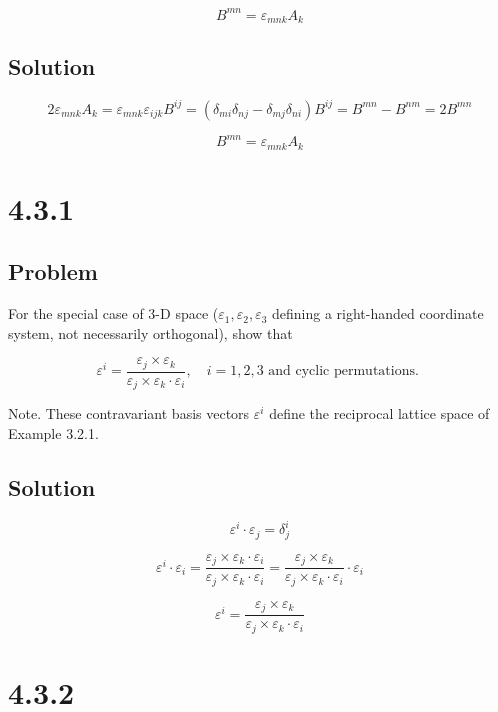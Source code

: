 \documentclass[12pt]{article}
\begin{document}
\[
    B^{mn} = \varepsilon_{mnk}A_k
\]

\subsection{Solution}

\[
    2\varepsilon_{mnk}A_k = \varepsilon_{mnk}\varepsilon_{ijk}B^{ij}
    = \left(\delta_{mi}\delta_{nj}-\delta_{mj}\delta_{ni}\right) B^{ij}
    = B^{mn}-B^{nm} = 2B^{mn}
\]

\[
    B^{mn} = \varepsilon_{mnk}A_k
\]

\newpage
\section{4.3.1}

\subsection{Problem}

For the special case of 3-D space (\(\varepsilon_1, \varepsilon_2, \varepsilon_3\) defining a right-handed coordinate system,
not necessarily orthogonal), show that

\[
    \varepsilon^i = \frac{\varepsilon_j \times \varepsilon_k}{\varepsilon_j \times \varepsilon_k \cdot \varepsilon_i}, \quad i = 1, 2, 3 \text{ and cyclic permutations. }
\]

Note. These contravariant basis vectors \(\varepsilon^i\) define the reciprocal lattice space of
Example 3.2.1.

\subsection{Solution}

\[
    \varepsilon^i \cdot \varepsilon_j = \delta^i_j
\]

\[
    \varepsilon^i \cdot \varepsilon_i = \frac{\varepsilon_j \times \varepsilon_k \cdot \varepsilon_i}{\varepsilon_j \times \varepsilon_k \cdot \varepsilon_i}
    = \frac{\varepsilon_j \times \varepsilon_k}{\varepsilon_j \times \varepsilon_k \cdot \varepsilon_i} \cdot \varepsilon_i
\]

\[
    \varepsilon^i = \frac{\varepsilon_j \times \varepsilon_k}{\varepsilon_j \times \varepsilon_k \cdot \varepsilon_i}
\]

\newpage
\section{4.3.2}
\end{document}

